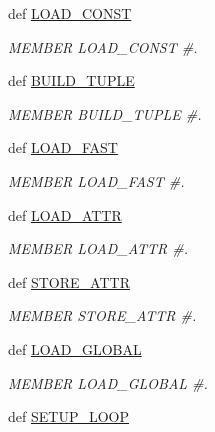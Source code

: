 \begin{DoxyCompactItemize}
def \hyperlink{classscipy_1_1weave_1_1bytecodecompiler_1_1CXXCoder_aaee93d98198b3930331a709220117d95}{L\+O\+A\+D\+\_\+\+C\+O\+N\+S\+T}
\begin{DoxyCompactList}\small\item\em M\+E\+M\+B\+E\+R L\+O\+A\+D\+\_\+\+C\+O\+N\+S\+T \#. \end{DoxyCompactList}\item 
def \hyperlink{classscipy_1_1weave_1_1bytecodecompiler_1_1CXXCoder_a9297625c9e84cc20de6f45f3516d512c}{B\+U\+I\+L\+D\+\_\+\+T\+U\+P\+L\+E}
\begin{DoxyCompactList}\small\item\em M\+E\+M\+B\+E\+R B\+U\+I\+L\+D\+\_\+\+T\+U\+P\+L\+E \#. \end{DoxyCompactList}\item 
def \hyperlink{classscipy_1_1weave_1_1bytecodecompiler_1_1CXXCoder_ae83a10d76d83b412fdbd6d6ab15609c7}{L\+O\+A\+D\+\_\+\+F\+A\+S\+T}
\begin{DoxyCompactList}\small\item\em M\+E\+M\+B\+E\+R L\+O\+A\+D\+\_\+\+F\+A\+S\+T \#. \end{DoxyCompactList}\item 
def \hyperlink{classscipy_1_1weave_1_1bytecodecompiler_1_1CXXCoder_a092a697184d95c2dd6e33796cf7928e1}{L\+O\+A\+D\+\_\+\+A\+T\+T\+R}
\begin{DoxyCompactList}\small\item\em M\+E\+M\+B\+E\+R L\+O\+A\+D\+\_\+\+A\+T\+T\+R \#. \end{DoxyCompactList}\item 
def \hyperlink{classscipy_1_1weave_1_1bytecodecompiler_1_1CXXCoder_a9f27bc7319dd7699ce7b552e45c31217}{S\+T\+O\+R\+E\+\_\+\+A\+T\+T\+R}
\begin{DoxyCompactList}\small\item\em M\+E\+M\+B\+E\+R S\+T\+O\+R\+E\+\_\+\+A\+T\+T\+R \#. \end{DoxyCompactList}\item 
def \hyperlink{classscipy_1_1weave_1_1bytecodecompiler_1_1CXXCoder_aaeface59d30810ef32e837e4eb95c7b7}{L\+O\+A\+D\+\_\+\+G\+L\+O\+B\+A\+L}
\begin{DoxyCompactList}\small\item\em M\+E\+M\+B\+E\+R L\+O\+A\+D\+\_\+\+G\+L\+O\+B\+A\+L \#. \end{DoxyCompactList}\item 
def \hyperlink{classscipy_1_1weave_1_1bytecodecompiler_1_1CXXCoder_afdfdab929ce94723a071c94797136001}{S\+E\+T\+U\+P\+\_\+\+L\+O\+O\+P}

\end{DoxyCompactItemize}
